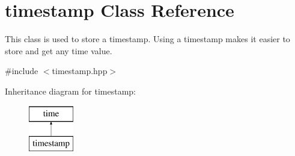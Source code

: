 \hypertarget{classtimestamp}{}\section{timestamp Class Reference}
\label{classtimestamp}


This class is used to store a timestamp. Using a timestamp makes it easier to store and get any time value.  




{\ttfamily \#include $<$timestamp.\+hpp$>$}

Inheritance diagram for timestamp\+:\begin{figure}[H]
\begin{center}
\leavevmode
\includegraphics[height=2.000000cm]{classtimestamp}
\end{center}
\end{figure}
